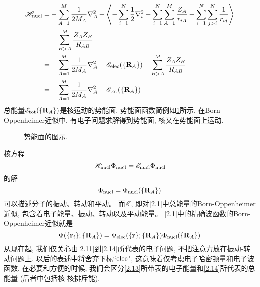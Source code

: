 \begin{equation}
\begin{split}
\mathscr{H}_{\rm nucl}= &- \sum_{A=1}^{M}\frac{1}{2M_A}\nabla_A^2 + \Braket{-\sum_{i=1}^{N}\frac{1}{2}\nabla_i^2 - \sum_{i=1}^{N}\sum_{A=1}^{M}\frac{Z_A}{r_{iA}} + \sum_{i=1}^{N}\sum_{j>i}^{N}\frac{1}{r_{ij}}}\\
& + \sum_{B>A}^M\frac{Z_AZ_B}{R_{AB}}\\
= & - \sum_{A=1}^{M}\frac{1}{2M_A}\nabla_A^2 + \mathscr{E}_{\rm elec}(\{\mathbf{R}_A\}) + \sum_{B>A}^M\frac{Z_AZ_B}{R_{AB}}\\
= & - \sum_{A=1}^{M}\frac{1}{2M_A}\nabla_A^2 + \mathscr{E}_{\rm tot}(\{\mathbf{R}_A\})
\end{split}
\end{equation}
总能量$ \mathscr{E}_{\rm tot}(\{\mathbf{R}_A\}) $是核运动的势能面. 
势能面函数简例如\ref{f2.2}所示. 
在Born-Oppenheimer近似中, 
有电子问题求解得到势能面, 
核又在势能面上运动. 

\begin{figure}[H]
	\def\FunctionA(#1){180*((0.6/(#1+.5))^(12) -(0.6/(#1+ .5))^(6)) + 60}
	\def\FunctionF(#1){(#1)^3- 3*(#1)}
	\caption{势能面的图示.}
	\label{f2.2}
\end{figure}
核\sch 方程
\begin{equation}
\mathscr{H}_{\rm nucl}\Phi_{\rm nucl} = \mathscr{E}_{\rm nucl}\Phi_{\rm nucl}
\end{equation}的解
\begin{equation}
\Phi_{\rm nucl}=\Phi_{\rm nucl}(\{\mathbf{R}_A\})
\end{equation}
可以描述分子的振动、转动和平动。
而$\mathscr{E}$, 
即对\ref{2.1}中总能量的Born-Oppenheimer近似,
包含着电子能量、振动、转动以及平动能量。
\ref{2.1}中的精确波函数的Born-Oppenheimer近似就是
\begin{equation}
\Phi(\{\mathbf{r}_i\};\{\mathbf{R}_A\}) = \Phi_{\rm elec}(\{\mathbf{r}\};\{\mathbf{R}_A\})\Phi_{\rm nucl}(\{\mathbf{R}_A\})
\end{equation}
从现在起,
我们仅关心由\ref{2.11}到\ref{2.14}所代表的电子问题, 
不把注意力放在振动-转动问题上.
以后的表述中将舍弃下标``$\rm elec$", 
 这意味着仅考虑电子哈密顿量和电子波函数. 
在必要和方便的时候, 
我们会区分\ref{2.13}所带表的电子能量和\ref{2.14}所代表的总能量 (后者中包括核-核排斥能).


